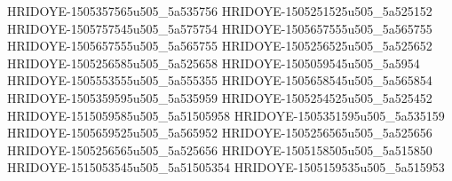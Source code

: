 HRIDOYE-1505357565u505_5a535756
HRIDOYE-1505251525u505_5a525152
HRIDOYE-1505757545u505_5a575754
HRIDOYE-1505657555u505_5a565755
HRIDOYE-1505657555u505_5a565755
HRIDOYE-1505256525u505_5a525652
HRIDOYE-1505256585u505_5a525658
HRIDOYE-1505059545u505_5a5954
HRIDOYE-1505553555u505_5a555355
HRIDOYE-1505658545u505_5a565854
HRIDOYE-1505359595u505_5a535959
HRIDOYE-1505254525u505_5a525452
HRIDOYE-1515059585u505_5a51505958
HRIDOYE-1505351595u505_5a535159
HRIDOYE-1505659525u505_5a565952
HRIDOYE-1505256565u505_5a525656
HRIDOYE-1505256565u505_5a525656
HRIDOYE-1505158505u505_5a515850
HRIDOYE-1515053545u505_5a51505354
HRIDOYE-1505159535u505_5a515953
